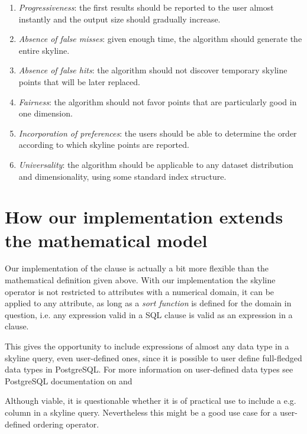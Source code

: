 \begin{enumerate}
\item \emph{Progressiveness}: the first results should be reported to the user almost instantly and the output size should gradually increase.

\item \emph{Absence of false misses}: given enough time, the algorithm should generate the entire skyline.

\item \emph{Absence of false hits}: the algorithm should not discover temporary skyline points that will be later replaced.

\item \emph{Fairness}: the algorithm should not favor points that are particularly good in one dimension.

\item \emph{Incorporation of preferences}: the users should be able to determine the order according to which skyline points are reported.

\item \emph{Universality}: the algorithm should be applicable to any dataset distribution and dimensionality, using some standard index structure.
\end{enumerate}


\section{How our implementation extends the mathematical model}
Our implementation of the  clause is actually a
bit more flexible than the mathematical definition given above. With
our implementation the skyline operator is not restricted to
attributes with a numerical domain, it can be applied to any
attribute, as long as a \emph{sort function} is defined for the domain
in question, i.e.\/ any expression valid in a SQL 
clause is valid as an expression in a  clause.

This gives the opportunity to include expressions of almost any data
type in a skyline query, even user-defined ones, since it is possible
to user define full-fledged data types in PostgreSQL. For more
information on user-defined data types see PostgreSQL documentation on
 and

Although viable, it is questionable whether it is of practical use to include a
e.g.  column in a skyline query.
Nevertheless this might be a good use case for a user-defined ordering operator.

